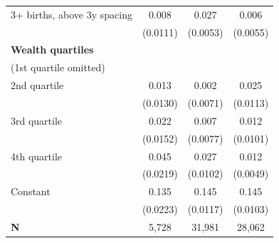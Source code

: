 {\begin{tabular}{l*{3}{c}}
\addlinespace
\hspace*{1em}3+ births, above 3y spacing&       0.008         &       0.027\sym{***}&       0.006         \\
                    &    (0.0111)         &    (0.0053)         &    (0.0055)         \\
\addlinespace
\textbf{Wealth quartiles} \\ (1st quartile omitted)&                     &                     &                     \\
\addlinespace
\hspace*{1em}2nd quartile&       0.013         &       0.002         &       0.025\sym{*}  \\
                    &    (0.0130)         &    (0.0071)         &    (0.0113)         \\
\addlinespace
\hspace*{1em}3rd quartile&       0.022         &       0.007         &       0.012         \\
                    &    (0.0152)         &    (0.0077)         &    (0.0101)         \\
\addlinespace
\hspace*{1em}4th quartile&       0.045\sym{*}  &       0.027\sym{**} &       0.012\sym{*}  \\
                    &    (0.0219)         &    (0.0102)         &    (0.0049)         \\
\addlinespace
\hspace*{1em}Constant&       0.135\sym{***}&       0.145\sym{***}&       0.145\sym{***}\\
                    &    (0.0223)         &    (0.0117)         &    (0.0103)         \\
\midrule
\textbf{N}          &       5,728         &      31,981         &      28,062         \\
\bottomrule
\end{tabular}
}
